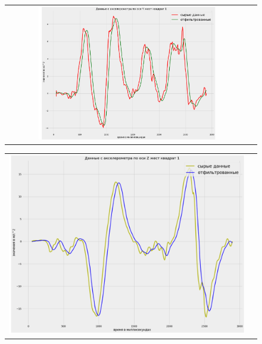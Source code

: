 \begin{figure}[H]
    \begin{center}
        \begin{tabular}{cc}
            \includegraphics[width=0.75\textwidth]{farim/sqxres} & 
        \end{tabular}
    \end{center}
\end{figure}

\begin{figure}[H]
    \begin{center}
        \begin{tabular}{cc}
            \includegraphics[width=1\textwidth]{farim/sqzres} & 
        \end{tabular}
    \end{center}
\end{figure}

\newpage

